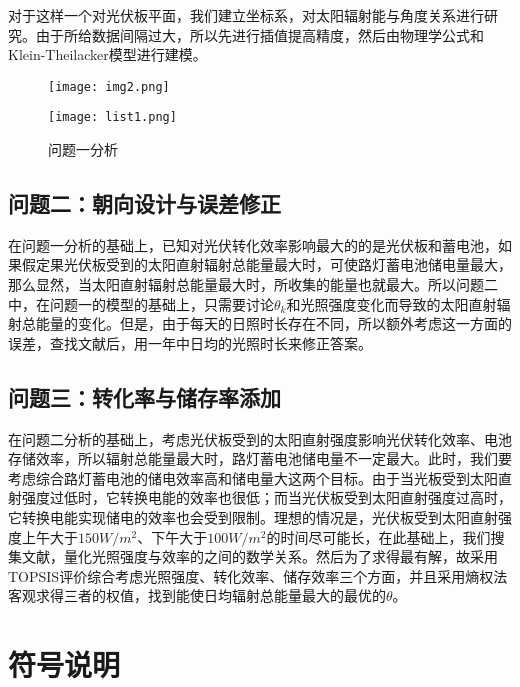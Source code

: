 \documentclass[withoutpreface,bwprint]{cumcmthesis} %
\begin{document}
对于这样一个对光伏板平面，我们建立坐标系，对太阳辐射能与角度关系进行研究。由于所给数据间隔过大，所以先进行插值提高精度，然后由物理学公式和Klein-Theilacker模型进行建模。
\begin{figure}
	\centering
	\begin{minipage}[c]{0.48\textwidth}
		\centering
		\texttt{[image: img2.png]}
		\label{fig:001}
	\end{minipage}
	\begin{minipage}[c]{0.48\textwidth}
		\centering
		\texttt{[image: list1.png]}
	\end{minipage}
	\caption{问题一分析}
\end{figure}


\subsection{问题二：朝向设计与误差修正}

在问题一分析的基础上，已知对光伏转化效率影响最大的的是光伏板和蓄电池，如果假定果光伏板受到的太阳直射辐射总能量最大时，可使路灯蓄电池储电量最大，那么显然，当太阳直射辐射总能量最大时，所收集的能量也就最大。所以问题二中，在问题一的模型的基础上，只需要讨论$\theta_{k}$和光照强度变化而导致的太阳直射辐射总能量的变化。但是，由于每天的日照时长存在不同，所以额外考虑这一方面的误差，查找文献后，用一年中日均的光照时长来修正答案。

\subsection{问题三：转化率与储存率添加}

在问题二分析的基础上，考虑光伏板受到的太阳直射强度影响光伏转化效率、电池存储效率，所以辐射总能量最大时，路灯蓄电池储电量不一定最大。此时，我们要考虑综合路灯蓄电池的储电效率高和储电量大这两个目标。由于当光板受到太阳直射强度过低时，它转换电能的效率也很低；而当光伏板受到太阳直射强度过高时，它转换电能实现储电的效率也会受到限制。理想的情况是，光伏板受到太阳直射强度上午大于$150W/m^{2}$、下午大于$100W/m^{2}$的时间尽可能长，在此基础上，我们搜集文献，量化光照强度与效率的之间的数学关系。然后为了求得最有解，故采用TOPSIS评价综合考虑光照强度、转化效率、储存效率三个方面，并且采用熵权法客观求得三者的权值，找到能使日均辐射总能量最大的最优的$\theta$。



\newpage



\section{符号说明}
\end{document}
